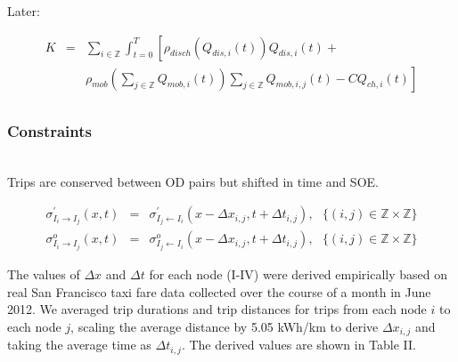 \documentclass[journal]{IEEEtran}
\begin{document}
Later:

\begin{eqnarray*}
    K &=& \sum_{i\in\mathbb{Z}} \int_{t=0}^{T} \left[ \rho_{disch}(Q_{dis,i}(t)) Q_{dis,i}(t) + \right. \\ && \left. \rho_{mob}\left(\sum_{j\in\mathbb{Z}}Q_{mob,i}(t)\right)\sum_{j\in\mathbb{Z}}Q_{mob,i,j}(t) - CQ_{ch,i}(t) \right]\\
\end{eqnarray*}

\subsubsection{Constraints}
~ \\

Trips are conserved between OD pairs but shifted in time and SOE.

\begin{eqnarray*}
    \sigma_{I_i \rightarrow I_j}^\prime(x,t) & = & \sigma_{I_j \leftarrow I_i}^\prime(x - \Delta x_{i,j},t + \Delta t_{i,j}), ~~~ \{(i,j) \in \mathbb{Z} \times \mathbb{Z}\} \\
     \sigma_{I_i \rightarrow I_j}^o(x,t) & = & \sigma_{I_j \leftarrow I_i}^o(x - \Delta x_{i,j},t + \Delta t_{i,j}), ~~~ \{(i,j) \in \mathbb{Z} \times \mathbb{Z}\}
\end{eqnarray*}

The values of $\Delta x$ and $\Delta t$ for each node (I-IV) were derived empirically based on real San Francisco taxi fare data collected over the course of a month in June 2012. We averaged trip durations and trip distances for trips from each node $i$ to each node $j$,  scaling the average distance by 5.05 kWh/km to derive $\Delta x_{i,j}$ and taking the average time as $\Delta t_{i,j}$. The derived values are shown in Table II.
\end{document}

